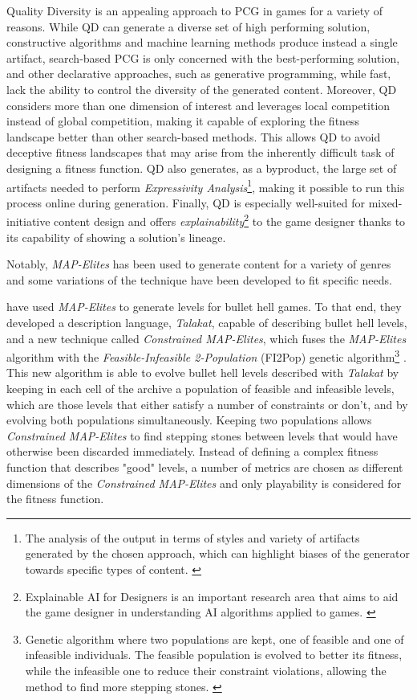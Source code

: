 Quality Diversity is an appealing approach to PCG in games for a variety of reasons. 
While QD can generate a diverse set of high performing solution, constructive algorithms and machine learning methods produce instead a single artifact, search-based PCG is only concerned with the best-performing solution, and other declarative approaches, such as generative programming, while fast, lack the ability to control the diversity of the generated content. Moreover, QD considers more than one dimension of interest and leverages local competition instead of global competition, making it capable of exploring the fitness landscape better than other search-based methods. This allows QD to avoid deceptive fitness landscapes that may arise from the inherently difficult task of designing a fitness function. QD also generates, as a byproduct, the large set of artifacts needed to perform \textit{Expressivity Analysis}\footnote{The analysis of the output in terms of styles and variety of artifacts generated by the chosen approach, which can highlight biases of the generator towards specific types of content. \cite{gravina_procedural_2019}}, making it possible to run this process online during generation. Finally, QD is especially well-suited for mixed-initiative content design and offers \textit{explainability}\footnote{Explainable AI for Designers is an important research area that aims to aid the game designer in understanding AI algorithms applied to games. \cite{gravina_procedural_2019}} to the game designer thanks to its capability of showing a solution's lineage. \cite{gravina_procedural_2019} 


Notably, \textit{MAP-Elites} has been used to generate content for a variety of genres and some variations of the technique have been developed to fit specific needs. 

\citeauthor{khalifa_talakat_2018} have used \textit{MAP-Elites} to generate levels for bullet hell games. To that end, they developed a description language, \textit{Talakat}, capable of describing bullet hell levels, and a new technique called \textit{Constrained MAP-Elites}, which fuses the \textit{MAP-Elites} algorithm with the \textit{Feasible-Infeasible 2-Population} (FI2Pop) genetic algorithm\footnote{Genetic algorithm where two populations are kept, one of feasible and one of infeasible individuals. The feasible population is evolved to better its fitness, while the infeasible one to reduce their constraint violations, allowing the method to find more stepping stones. \cite{kimbrough_feasibleinfeasible_2008}} \cite{kimbrough_feasibleinfeasible_2008}. This new algorithm is able to evolve bullet hell levels described with \textit{Talakat} by keeping in each cell of the archive a population of feasible and infeasible levels, which are those levels that either satisfy a number of constraints or don't, and by evolving both populations simultaneously. Keeping two populations allows \textit{Constrained MAP-Elites} to find stepping stones between levels that would have otherwise been discarded immediately. Instead of defining a complex fitness function that describes "good" levels, a number of metrics are chosen as different dimensions of the \textit{Constrained MAP-Elites} and only playability is considered for the fitness function. \cite{khalifa_talakat_2018}

